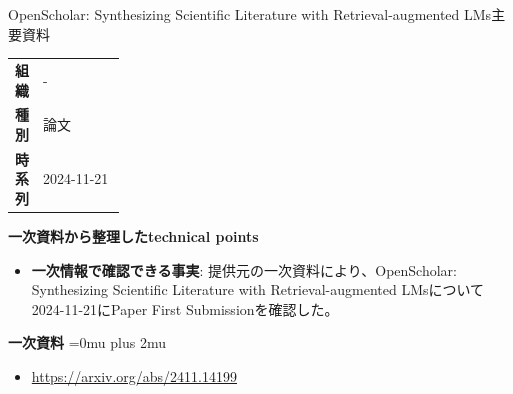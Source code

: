 \begin{technicalnote}{OpenScholar: Synthesizing Scientific Literature with Retrieval-augmented LMs}{主要資料}
\begingroup
\begin{tabularx}{\linewidth}{@{}>{\bfseries}p{0.22\linewidth}X@{}}
組織 & - \\
種別 & 論文 \\
時系列 & 2024-11-21 \\
\end{tabularx}
\smallskip
{\bfseries 一次資料から整理したtechnical points}
\begin{itemize}[leftmargin=1.5em,itemsep=0.35em]
\item \textbf{一次情報で確認できる事実}: 提供元の一次資料により、OpenScholar: Synthesizing Scientific Literature with Retrieval-augmented LMsについて2024-11-21にPaper First Submissionを確認した。
\end{itemize}
\begin{minipage}{\linewidth}
\begin{samepage}
{\bfseries 一次資料}
\begingroup\sloppy
\Urlmuskip=0mu plus 2mu\relax
\begin{itemize}[leftmargin=1.5em,itemsep=0.25em]
\item {\scriptsize\url{https://arxiv.org/abs/2411.14199}}
\end{itemize}
\endgroup
\end{samepage}
\end{minipage}
\endgroup
\end{technicalnote}
\medskip

